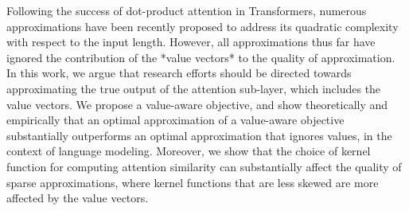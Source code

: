 Following the success of dot-product attention in Transformers, numerous approximations have been recently proposed to address its quadratic complexity with respect to the input length. However, all approximations thus far have ignored the contribution of the *value vectors* to the quality of approximation. In this work, we argue that research efforts should be directed towards approximating the true output of the attention sub-layer, which includes the value vectors. We propose a value-aware objective, and show theoretically and empirically that an optimal approximation of a value-aware objective substantially outperforms an optimal approximation that ignores values, in the context of language modeling. Moreover, we show that the choice of kernel function for computing attention similarity can substantially affect the quality of sparse approximations, where kernel functions that are less skewed are more affected by the value vectors.
